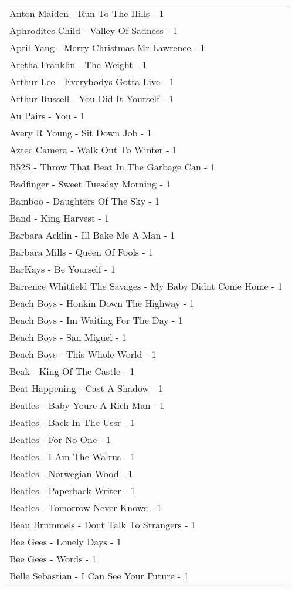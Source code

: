 \documentclass[
]{article}
\begin{document}
\begin{longtable}{l}
Anton Maiden - Run To The Hills - 1 \\ 
Aphrodites Child - Valley Of Sadness - 1 \\ 
April Yang - Merry Christmas Mr Lawrence - 1 \\ 
Aretha Franklin - The Weight - 1 \\ 
Arthur Lee - Everybodys Gotta Live - 1 \\ 
Arthur Russell - You Did It Yourself - 1 \\ 
Au Pairs - You - 1 \\ 
Avery R Young - Sit Down Job - 1 \\ 
Aztec Camera - Walk Out To Winter - 1 \\ 
B52S - Throw That Beat In The Garbage Can - 1 \\ 
Badfinger - Sweet Tuesday Morning - 1 \\ 
Bamboo - Daughters Of The Sky - 1 \\ 
Band - King Harvest - 1 \\ 
Barbara Acklin - Ill Bake Me A Man - 1 \\ 
Barbara Mills - Queen Of Fools - 1 \\ 
BarKays - Be Yourself - 1 \\ 
Barrence Whitfield The Savages - My Baby Didnt Come Home - 1 \\ 
Beach Boys - Honkin Down The Highway - 1 \\ 
Beach Boys - Im Waiting For The Day - 1 \\ 
Beach Boys - San Miguel - 1 \\ 
Beach Boys - This Whole World - 1 \\ 
Beak - King Of The Castle - 1 \\ 
Beat Happening - Cast A Shadow - 1 \\ 
Beatles - Baby Youre A Rich Man - 1 \\ 
Beatles - Back In The Ussr - 1 \\ 
Beatles - For No One - 1 \\ 
Beatles - I Am The Walrus - 1 \\ 
Beatles - Norwegian Wood - 1 \\ 
Beatles - Paperback Writer - 1 \\ 
Beatles - Tomorrow Never Knows - 1 \\ 
Beau Brummels - Dont Talk To Strangers - 1 \\ 
Bee Gees - Lonely Days - 1 \\ 
Bee Gees - Words - 1 \\ 
Belle Sebastian - I Can See Your Future - 1 \\ 

\end{longtable}
\end{document}
